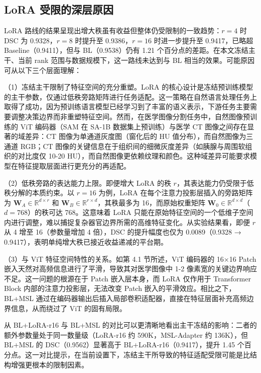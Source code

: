\subsection{LoRA 受限的深层原因}

LoRA 路线的结果呈现出增大秩虽有收益但整体仍受限制的一致趋势：$r=4$ 时 DSC 为 0.9328，$r=8$ 时提升至 0.9386，$r=16$ 时进一步提升至 0.9417，已略超 Baseline（0.9411），但与 BL（0.9538）仍有 1.21 个百分点的差距。在本文冻结主干、当前 rank 范围与数据规模下，这一路线未达到与 BL 相当的效果。可能原因可从以下三个层面理解：

（1）冻结主干限制了特征空间的充分重塑。LoRA 的核心设计是冻结预训练模型的主干参数，仅通过低秩旁路矩阵进行任务适配。这一策略在自然语言处理任务上取得了成功，因为预训练语言模型已经学习到了丰富的语义表示，下游任务主要需要调整决策边界而非重塑特征空间。然而，在医学图像分割任务中，自然图像预训练的 ViT 编码器（SAM 在 SA-1B 数据集上预训练）与医学 CT 图像之间存在显著的域差异：CT 图像为单通道灰度图（窗化后的 HU 值分布），而自然图像为三通道 RGB；CT 图像的关键信息在于组织间的细微灰度差异（如胰腺与周围软组织的对比度仅 10-20 HU），而自然图像更依赖纹理和颜色。这种域差异可能要求模型在特征提取层面进行更充分的再适配。

（2）低秩旁路的表达能力上限。即便增大 LoRA 的秩 $r$，其表达能力仍受限于低秩分解的本质约束。以 $r=16$ 为例，LoRA 在每个注意力投影层插入的旁路矩阵为 $\mathbf{W}_A \in \mathbb{R}^{d \times r}$ 和 $\mathbf{W}_B \in \mathbb{R}^{r \times d}$，其秩最多为 16，而原始权重矩阵 $\mathbf{W}_0 \in \mathbb{R}^{d \times d}$（$d=768$）的秩可达 768。这意味着 LoRA 只能在原始特征空间的一个低维子空间内进行调整，难以捕捉复杂器官边界所需的高维特征变化。从实验结果看，即便 $r$ 从 4 增至 16（参数量增加 4 倍），DSC 的提升幅度也仅为 0.0089（0.9328 → 0.9417），表明单纯增大秩已接近收益递减的平台期。

（3）与 ViT 特征空间特性的关系。如第 4.1 节所述，ViT 编码器的 16×16 Patch 嵌入天然对高频信息进行了平滑，导致其对医学图像中 1-2 像素宽的关键边界响应不足。这一问题的根源在于 Patch 嵌入层本身，而 LoRA 仅作用于 Transformer Block 内部的注意力投影层，无法改变 Patch 嵌入的平滑效应。相比之下，BL+MSL 通过在编码器输出后插入局部卷积适配器，直接在特征层面补充高频边界信息，从而绕过了 ViT 的固有局限。

从 BL+LoRA-r16 与 BL+MSL 的对比可以更清晰地看出主干冻结的影响：二者的额外参数量处于同一数量级（LoRA-r16 约 590K，MSL-Adapter 约 136K），但 BL+MSL 的 DSC（0.9562）显著高于 BL+LoRA-r16（0.9417），提升 1.45 个百分点。这一对比提示，在当前设置下，冻结主干所导致的特征适配受限可能是比结构增强更根本的限制因素。


